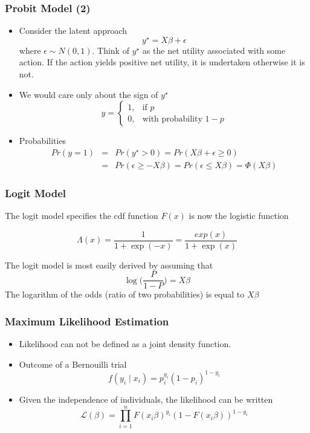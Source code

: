 \documentclass{beamer}
\newcommand{\Lik}{\mathcal{L}}
\newcommand{\1}{\mathbb{1}}
\begin{document}
\begin{frame}\frametitle{Probit Model (2)}
\begin{itemize}
\item Consider the latent approach
\begin{equation}
y^{\star} = X \beta + \epsilon
\end{equation} where $\epsilon \sim N(0,1)$. 
Think of $y^{\star}$ as the net utility associated with some action. If the action yields positive net utility, it is undertaken otherwise it is not. 
\item We would care only about the sign of $y^{\star}$
\begin{equation}
y = \begin{cases} 1, & \mbox{if } p \\ 0, & \mbox{with probability } 1-p \end{cases}
\end{equation}
\item Probabilities
\begin{eqnarray*}
Pr(y=1) &=& Pr(y^{\star} > 0) = Pr(X \beta + \epsilon \geq 0)\\
        &=& Pr( \epsilon \geq -X \beta) = Pr (\epsilon \leq X\beta) = \Phi(X\beta)
\end{eqnarray*}
\end{itemize}
\end{frame}

\begin{frame}\frametitle{Logit Model}
The logit model specifies the cdf function $F(x)$ is now the logistic function

\begin{equation}
\Lambda(x) = \dfrac{1}{1+ \exp(-x)} = \dfrac{exp(x)}{1+ \exp(x)} 
\end{equation}

The logit model is most easily derived by assuming that 
\begin{equation}
\log\Big(\dfrac{P}{1 - P}\Big) = X \beta
\end{equation}
The logarithm of the odds (ratio of two probabilities) is equal to $X\beta$
\end{frame}

\begin{frame}\frametitle{Maximum Likelihood Estimation}
\begin{itemize}
\item Likelihood can not be defined as a joint density function. 
\item Outcome of a Bernouilli trial
\begin{equation}
f(y_i \mid x_i) = p_i^{y_i} (1-p_i)^{1-y_i}
\end{equation}
\item Given the independence of individuals, the likelihood can be written
\begin{equation}
\Lik(\beta)  = \prod_{i=1}^{n} F(x_i\beta)^{y_i} (1-F(x_i\beta))^{1-y_i}
\end{equation}
\end{itemize}
\end{frame}
\end{document}
